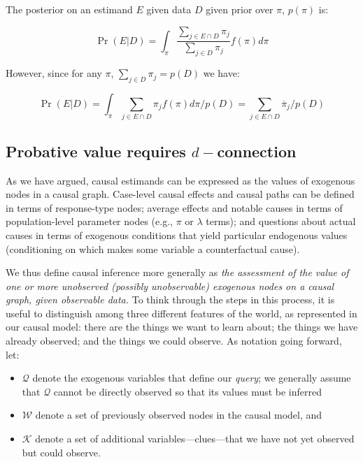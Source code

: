 \documentclass[
  12pt,
]{book}
\providecommand{\tightlist}{%
  \setlength{\itemsep}{0pt}\setlength{\parskip}{0pt}}
\begin{document}
The posterior on an estimand \(E\) given data \(D\) given prior over \(\pi\), \(p(\pi)\) is:

\[\Pr(E | D) = \int_\pi  \frac{\sum_{j \in E \cap D}\pi_j}{\sum_{j \in D}\pi_j} f(\pi)d\pi\]

However, since for any \(\pi\), \(\sum_{j \in D}\pi_j = p(D)\) we have:

\[\Pr(E | D) = \int_\pi  \sum_{j \in E \cap D}\pi_j f(\pi)d\pi/p(D) = \sum_{j \in  E \cap D} \overline{\pi}_j/p(D)\]

\hypertarget{probative-value-requires-d-connection}{%
\subsection{\texorpdfstring{Probative value requires \(d-\)connection}{Probative value requires d-connection}}\label{probative-value-requires-d-connection}}

As we have argued, causal estimands can be expressed as the values of exogenous nodes in a causal graph. Case-level causal effects and causal paths can be defined in terms of response-type nodes; average effects and notable causes in terms of population-level parameter nodes (e.g., \(\pi\) or \(\lambda\) terms); and questions about actual causes in terms of exogenous conditions that yield particular endogenous values (conditioning on which makes some variable a counterfactual cause).

We thus define causal inference more generally as \emph{the assessment of the value of one or more unobserved (possibly unobservable) exogenous nodes on a causal graph, given observable data.} To think through the steps in this process, it is useful to distinguish among three different features of the world, as represented in our causal model: there are the things we want to learn about; the things we have already observed; and the things we could observe. As notation going forward, let:

\begin{itemize}
\tightlist
\item
  \(\mathcal Q\) denote the exogenous variables that define our \emph{query}; we generally assume that \(\mathcal Q\) cannot be directly observed so that its values must be inferred
\item
  \(\mathcal W\) denote a set of previously observed nodes in the causal model, and
\item
  \(\mathcal K\) denote a set of additional variables---clues---that we have not yet observed but could observe.
\end{itemize}
\end{document}
